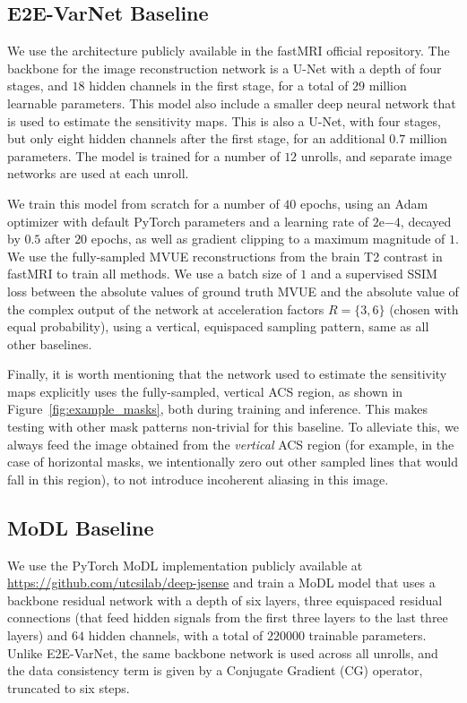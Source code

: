 \subsection{E2E-VarNet Baseline}
We use the architecture publicly available in the fastMRI official repository. The backbone for the image reconstruction network is a U-Net with a depth of four stages, and $18$ hidden channels in the first stage, for a total of $29$ million learnable parameters. This model also include a smaller deep neural network that is used to estimate the sensitivity maps. This is also a U-Net, with four stages, but only eight hidden channels after the first stage, for an additional $0.7$ million parameters. The model is trained for a number of $12$ unrolls, and separate image networks are used at each unroll.

We train this model from scratch for a number of $40$ epochs, using an Adam optimizer with default PyTorch parameters and a learning rate of $2\mathrm{e}{-4}$, decayed by $0.5$ after $20$ epochs, as well as gradient clipping to a maximum magnitude of $1$. We use the fully-sampled MVUE reconstructions from the brain T2 contrast in fastMRI to train all methods. We use a batch size of $1$ and a supervised SSIM loss between the absolute values of ground truth MVUE and the absolute value of the complex output of the network at acceleration factors $R=\{3,6\}$ (chosen with equal probability), using a vertical, equispaced sampling pattern, same as all other baselines.

Finally, it is worth mentioning that the network used to estimate the sensitivity maps explicitly uses the fully-sampled, vertical ACS region, as shown in Figure~\ref{fig:example_masks}, both during training and inference. This makes testing with other mask patterns non-trivial for this baseline. To alleviate this, we always feed the image obtained from the \textit{vertical} ACS region (for example, in the case of horizontal masks, we intentionally zero out other sampled lines that would fall in this region), to not introduce incoherent aliasing in this image.

\subsection{MoDL Baseline}
We use the PyTorch MoDL implementation publicly available at \url{https://github.com/utcsilab/deep-jsense} and train a MoDL model that uses a backbone residual network with a depth of six layers, three equispaced residual connections (that feed hidden signals from the first three layers to the last three layers) and $64$ hidden channels, with a total of $220000$ trainable parameters. Unlike E2E-VarNet, the same backbone network is used across all unrolls, and the data consistency term is given by a Conjugate Gradient (CG) operator, truncated to six steps.

